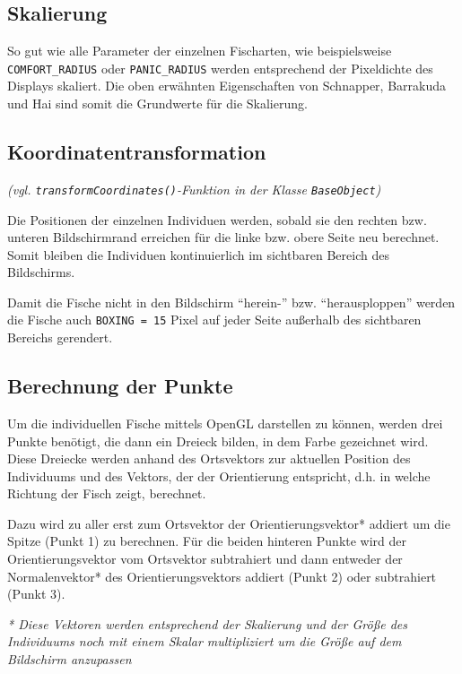 \documentclass[11pt]{article}
\begin{document}
\subsection{Skalierung}
So gut wie alle Parameter der einzelnen Fischarten, wie beispielsweise \lstinline[]$COMFORT_RADIUS$ oder \lstinline[]$PANIC_RADIUS$ werden entsprechend der Pixeldichte des Displays skaliert. Die oben erwähnten Eigenschaften von Schnapper, Barrakuda und Hai sind somit die Grundwerte für die Skalierung.

\subsection{Koordinatentransformation}
\textit{(vgl. \lstinline{transformCoordinates()}-Funktion in der Klasse \lstinline{BaseObject})}

\vspace{0.5em}
Die Positionen der einzelnen Individuen werden, sobald sie den rechten bzw. unteren Bildschirmrand erreichen für die linke bzw. obere Seite neu berechnet. Somit bleiben die Individuen kontinuierlich im sichtbaren Bereich des Bildschirms.

\vspace{0.5em}
Damit die Fische nicht in den Bildschirm ``herein-'' bzw. ``herausploppen'' werden die Fische auch \lstinline{BOXING = 15} Pixel auf jeder Seite außerhalb des sichtbaren Bereichs gerendert.
\subsection{Berechnung der Punkte}
Um die individuellen Fische mittels OpenGL darstellen zu können, werden drei Punkte benötigt, die dann ein Dreieck bilden, in dem Farbe gezeichnet wird. Diese Dreiecke werden anhand des Ortsvektors zur aktuellen Position des Individuums und des Vektors, der der Orientierung entspricht, d.h. in welche Richtung der Fisch zeigt, berechnet.

\vspace{0.5em}
Dazu wird zu aller erst zum Ortsvektor der Orientierungsvektor* addiert um die Spitze (Punkt 1) zu berechnen. Für die beiden hinteren Punkte wird der Orientierungsvektor vom Ortsvektor subtrahiert und dann entweder der Normalenvektor* des Orientierungsvektors addiert (Punkt 2) oder subtrahiert (Punkt 3).

\vspace{0.5em}
\textit{* Diese Vektoren werden entsprechend der Skalierung und der Größe des Individuums noch mit einem Skalar multipliziert um die Größe auf dem Bildschirm anzupassen}
\end{document}
